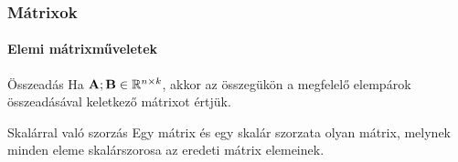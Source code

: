 \begin{frame}
  \frametitle{Mátrixok}
  \framesubtitle{Elemi mátrixműveletek}

  \vfill

  \begin{block}{Összeadás}
    Ha $\mathbf{A}; \mathbf{B} \in \mathbb R^{n \times k}$, akkor az összegükön a
    megfelelő elempárok összeadásával keletkező mátrixot értjük.
  \end{block}

  \vfill

  \begin{block}{Skalárral való szorzás}
    Egy mátrix és egy skalár szorzata olyan mátrix, melynek minden eleme
    skalárszorosa az eredeti mátrix elemeinek.
  \end{block}

  \vfill
\end{frame}

